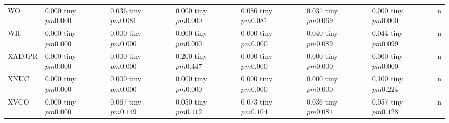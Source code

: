 \begin{table}
\begin{tabular}{llllllll}
WO & 0.000 tiny $ pm 0.000$ & 0.036 tiny $ pm 0.081$ & 0.000 tiny $ pm 0.000$ & 0.086 tiny $ pm 0.081$ & 0.031 tiny $ pm 0.069$ & 0.000 tiny $ pm 0.000$ & n \\
WR & 0.000 tiny $ pm 0.000$ & 0.000 tiny $ pm 0.000$ & 0.000 tiny $ pm 0.000$ & 0.000 tiny $ pm 0.000$ & 0.040 tiny $ pm 0.089$ & 0.044 tiny $ pm 0.099$ & n \\
XADJPR & 0.000 tiny $ pm 0.000$ & 0.000 tiny $ pm 0.000$ & 0.200 tiny $ pm 0.447$ & 0.000 tiny $ pm 0.000$ & 0.000 tiny $ pm 0.000$ & 0.000 tiny $ pm 0.000$ & n \\
XNUC & 0.000 tiny $ pm 0.000$ & 0.000 tiny $ pm 0.000$ & 0.000 tiny $ pm 0.000$ & 0.000 tiny $ pm 0.000$ & 0.000 tiny $ pm 0.000$ & 0.100 tiny $ pm 0.224$ & n \\
XVCO & 0.000 tiny $ pm 0.000$ & 0.067 tiny $ pm 0.149$ & 0.050 tiny $ pm 0.112$ & 0.073 tiny $ pm 0.104$ & 0.036 tiny $ pm 0.081$ & 0.057 tiny $ pm 0.128$ & n \\
\bottomrule
\end{tabular}
\end{table}
